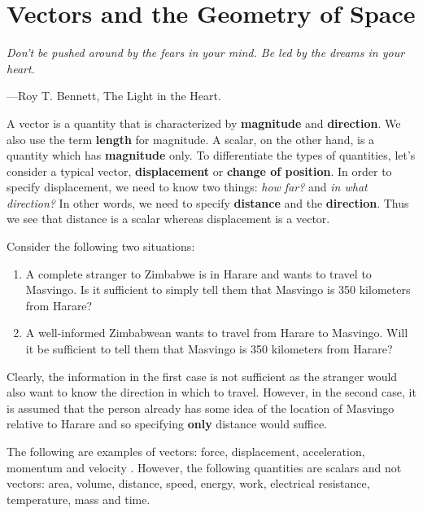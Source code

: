 \documentclass[titlepage,a4paper,12pt]{report}
\begin{document}
\chapter{Vectors and the Geometry of Space}
\begin{center}
	\small{\parbox{18cm}{
		\begin{raggedright}
		{\small
		\textit{Don't be pushed around by the fears in your mind. Be led by the dreams in your heart.}
 }
 
				\vspace{.5cm}\hfill{---Roy T. Bennett, The Light in the Heart.}
		\end{raggedright}
	}
} 
\end{center}
A vector is a quantity that is characterized by \textbf{magnitude} and \textbf{direction}. We also use the term \textbf{length} for magnitude. A scalar, on the other hand, is a quantity which has \textbf{magnitude} only. To differentiate the types of quantities, let's consider a typical vector, \textbf{displacement} or \textbf{change of position}. In order to specify displacement, we need to know two things: \textit{how far?} and \textit{in what direction?} In other words, we need to specify \textbf{distance} and the \textbf{direction}. Thus we see that distance is a scalar whereas displacement is a vector.

\noindent Consider the following two situations:
\begin{enumerate}
\item A complete stranger to Zimbabwe is in Harare and wants to travel to Masvingo. Is it sufficient to simply tell them that Masvingo is 350 kilometers from Harare?
\item A well-informed Zimbabwean wants to travel from Harare to Masvingo. Will it be sufficient to tell them that Masvingo is 350 kilometers from Harare?
\end{enumerate}
Clearly, the information in the first case is not sufficient as the stranger would also want to know the direction in which to travel. However, in the second case, it is assumed that the person already has some idea of the location of Masvingo relative to Harare and so specifying \textbf{only} distance would suffice.

\noindent The following are examples of vectors: force, displacement, acceleration, momentum and  velocity . However, the following quantities are scalars and not vectors: area, volume, distance, speed, energy, work, electrical resistance, temperature, mass and time.
\end{document}
